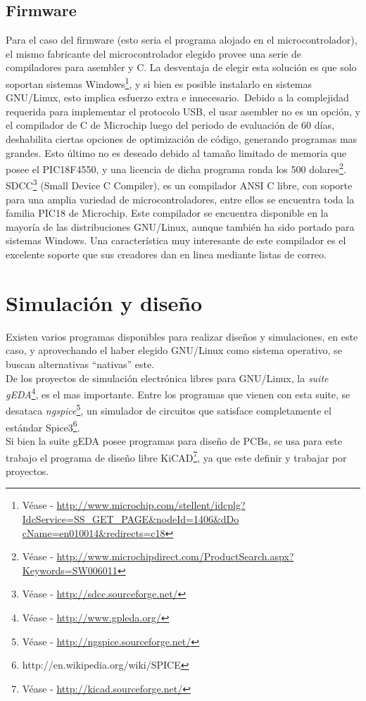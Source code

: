 \subsection{Firmware}
Para el caso del firmware (esto seria el programa alojado en el
microcontrolador), el mismo fabricante del microcontrolador elegido provee una
serie de compiladores para asembler y C. La desventaja de elegir esta
soluci\'on es que solo soportan sistemas Windows\footnote{V\'ease -
\url{
http://www.microchip.com/stellent/idcplg?IdcService=SS_GET_PAGE&nodeId=1406&dDo
cName=en010014&redirects=c18}}, y si bien es posible instalarlo en sistemas
GNU/Linux, esto implica esfuerzo extra e innecesario.\
Debido a la complejidad requerida para implementar el protocolo USB, el usar
asembler no es un opci\'on, y el compilador de C de Microchip luego del
periodo de evaluaci\'on de 60 d\'ias, deshabilita ciertas opciones de
optimizaci\'on de c\'odigo, generando programas mas grandes. Esto \'ultimo no
es
deseado debido al tama\~no limitado de memoria que posee el PIC18F4550, y una
licencia de dicha programa ronda los 500 dolares\footnote{V\'ease -
\url{http://www.microchipdirect.com/ProductSearch.aspx?Keywords=SW006011}}.\\

SDCC\footnote{V\'ease - \url{http://sdcc.sourceforge.net/}} (Small Device C
Compiler), es un compilador ANSI C libre, con soporte para una amplia variedad
de microcontroladores, entre ellos se encuentra toda la familia PIC18 de
Microchip. Este compilador se encuentra disponible en la mayor\'ia de las
distribuciones GNU/Linux, aunque tambi\'en ha sido portado para sistemas
Windows. Una caracter\'istica muy interesante de este compilador es el
excelente
soporte que sus creadores dan en linea mediante listas de correo.\\


\section{Simulaci\'on y dise\~no}
Existen varios programas disponibles para realizar dise\~nos y simulaciones,
en este caso, y aprovechando el haber elegido GNU/Linux como sistema
operativo, se buscan alternativas ``nativas'' este.\\

De los proyectos de simulaci\'on electr\'onica libres para GNU/Linux, la
\emph{suite gEDA}\footnote{V\'ease - \url{http://www.gpleda.org/}}, es el mas
importante. Entre los programas que vienen con esta suite, se desataca
\emph{ngspice}\footnote{V\'ease - \url{http://ngspice.sourceforge.net/}}, un
simulador de circuitos que satisface completamente el est\'andar
Spice3\footnote{http://en.wikipedia.org/wiki/SPICE}.\\

Si bien la suite gEDA posee programas para dise\~no de PCBs, se usa para este
trabajo el programa de dise\~no libre KiCAD\footnote{V\'ease -
\url{http://kicad.sourceforge.net/}}, ya que este definir y trabajar por
proyectos.







